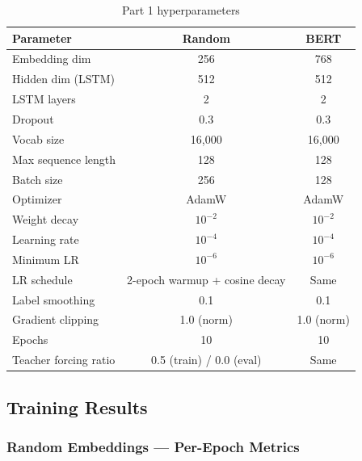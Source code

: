 \documentclass[12pt,a4paper]{article}
\begin{document}
\begin{table}[H]
\centering\small
\caption{Part 1 hyperparameters}
\label{tab:part1_hparams}
\begin{tabular}{lcc}
\toprule
\textbf{Parameter} & \textbf{Random} & \textbf{BERT} \\
\midrule
Embedding dim & 256 & 768 \\
Hidden dim (LSTM) & 512 & 512 \\
LSTM layers & 2 & 2 \\
Dropout & 0.3 & 0.3 \\
Vocab size & 16,000 & 16,000 \\
Max sequence length & 128 & 128 \\
Batch size & 256 & 128 \\
Optimizer & AdamW & AdamW \\
Weight decay & $10^{-2}$ & $10^{-2}$ \\
Learning rate & $10^{-4}$ & $10^{-4}$ \\
Minimum LR & $10^{-6}$ & $10^{-6}$ \\
LR schedule & 2-epoch warmup + cosine decay & Same \\
Label smoothing & 0.1 & 0.1 \\
Gradient clipping & 1.0 (norm) & 1.0 (norm) \\
Epochs & 10 & 10 \\
Teacher forcing ratio & 0.5 (train) / 0.0 (eval) & Same \\
\bottomrule
\end{tabular}
\end{table}

\subsection{Training Results}

\subsubsection{Random Embeddings — Per-Epoch Metrics}
\end{document}

